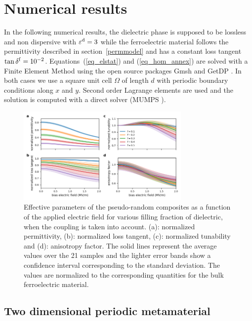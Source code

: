 \documentclass[%
 aip,
 amsmath,amssymb,
 reprint,%
linenumbers
]{revtex4-1}
\newcommand{\epsd}{\varepsilon^{\rm d}}
\newcommand{\co}[1]{\textcolor{correction}{#1}}
\begin{document}
\section{Numerical results}
In the following numerical results, the dielectric phase is supposed to be
lossless and non dispersive with $\epsd = 3$ while the ferroelectric material follows the
permittivity described in section~\ref{permmodel} and has a constant loss
tangent $\tan \delta^{\rm f} = 10^{-2}$.
Equations~(\ref{eq_elstat}) and (\ref{eq_hom_annex}) are solved with a Finite Element
Method using the open source packages Gmsh \cite{geuzaine_gmsh_2009} and GetDP \cite{dular_general_1998}.
In both cases we use a square unit cell $\Omega$ of length $d$ with periodic boundary
conditions along $x$ and $y$. Second order Lagrange elements are used and the
solution is computed with a direct solver (MUMPS \cite{amestoy_fully_2001}).

\begin{figure}[!t]
 \centering
 \includegraphics[width=0.75\textwidth]{effpar_rand_cpl.png}
 \caption{Effective parameters of the pseudo-random composites as a function of the
  applied electric field for various filling fraction of dielectric, when the
  coupling is taken into account.
  (a): normalized permittivity, (b): normalized loss tangent, (c): normalized tunability and
  (d): anisotropy factor. The solid lines represent the average values
  over the 21 samples and the lighter error bands show a confidence interval corresponding to
  the standard deviation. \co{The values are normalized to the corresponding quantities for the bulk ferroelectric material.}}
 \label{eff_par_2Drand_TM}
\end{figure}
%


\subsection{Two dimensional periodic metamaterial}
\end{document}
